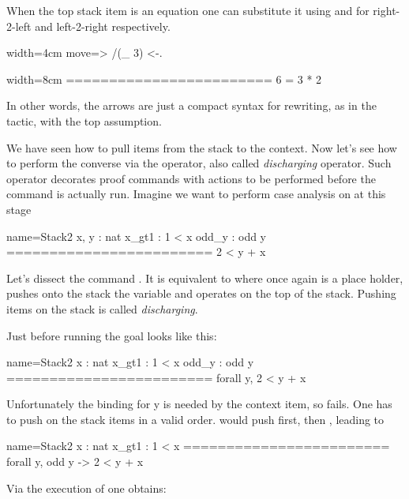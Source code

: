 When the top stack item is an equation one can substitute it using \C{<-}
and \C{->} for right-2-left and left-2-right respectively.

\begin{coq}{}{width=4cm}
move=> /(_ 3) <-.
\end{coq}
\begin{coqout}{}{width=8cm}
========================
6 = 3 * 2
\end{coqout}
In other words, the arrows are just a compact syntax for rewriting,
as in the  tactic, with the top assumption.


We have seen how to pull items from the stack to the context.  Now let's see
how to perform the converse via the \C{:} operator, also called
\emph{discharging} operator.  Such operator decorates
proof commands with actions to be performed before the command is actually run.
Imagine we want to perform case analysis on  at this stage

\begin{coqout}{name=Stack2}{}
 x, y : nat
 x_gt1 : 1 < x
 odd_y : odd y
 ========================
 2 < y + x
\end{coqout}

Let's dissect the command .  It is equivalent to
 where  once again is a place holder,
 pushes onto the stack the  variable and 
operates on the top of the stack.
Pushing items on the stack is called \emph{discharging}.

Just before running  the goal looks like this:

\begin{coqout}{name=Stack2}{}
 x : nat
 x_gt1 : 1 < x
 odd_y : odd y
 ========================
 forall y, 2 < y + x
\end{coqout}

Unfortunately the binding for y is needed by the 
context item, so  fails.  One has to push on the stack
items in a valid order.   would push 
first, then , leading to

\begin{coqout}{name=Stack2}{}
 x : nat
 x_gt1 : 1 < x
 ========================
 forall y, odd y -> 2 < y + x
\end{coqout}

Via the execution of  one obtains:

